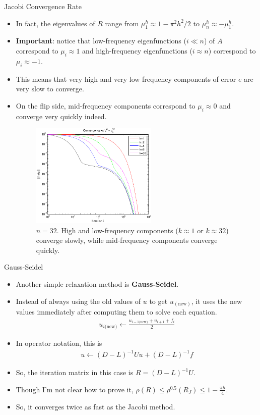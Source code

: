 \documentclass{beamer}
\begin{document}
\begin{frame}[allowframebreaks]{Jacobi Convergence Rate}
\begin{itemize}
\begin{figure}
{            method on our model problem.}
  \end{figure}
  \item In fact, the eigenvalues of $R$ range from $\mu_1^h \approx 1-\pi^2h^2/2$
        to $\mu_n^h \approx -\mu_1^h$.
  \item \textbf{Important}: notice that low-frequency eigenfunctions ($i\ll n$)
        of $A$ correspond to $\mu_i \approx 1$ and high-frequency eigenfunctions
        ($i \approx n$) correspond to $\mu_i \approx -1$.
  \item This means that very high and very low frequency components of error $e$
        are very slow to converge.
  \item On the flip side, mid-frequency components correspond to
        $\mu_i \approx 0$ and converge very quickly indeed.
  \begin{figure}
   \includegraphics[width=6cm]{images/jacobiConvergence_freq.pdf}
   \caption{$n=32$. High and low-frequency components ($k \approx 1$ or
            $k \approx 32$) converge slowly, while mid-frequency components
            converge quickly.}
  \end{figure}
 \end{itemize}
\end{frame}

\begin{frame}[allowframebreaks]{Gauss-Seidel}
 \begin{itemize}
  \item Another simple relaxation method is \textbf{Gauss-Seidel}.
  \item Instead of always using the old values of $u$ to get $u_(\text{new})$,
        it uses the new values immediately after computing them to solve each
        equation.
  \begin{align}
   u_{i\text{(new)}} \leftarrow \frac{u_{i-1\text{(new)}}+u_{i+1}+f_i}{2}
  \end{align}
  \item In operator notation, this is
  \begin{align}
   u \leftarrow (D-L)^{-1}Uu + (D-L)^{-1}f
  \end{align}
  \item So, the iteration matrix in this case is $R=(D-L)^{-1}U$.
  \item Though I'm not clear how to prove it,
        $\rho(R) \leq \rho^{0.5}(R_J) \leq 1-\frac{\pi h}{4}$.
  \item So, it converges twice as fast as the Jacobi method.
 \end{itemize}
\end{frame}
\end{document}
